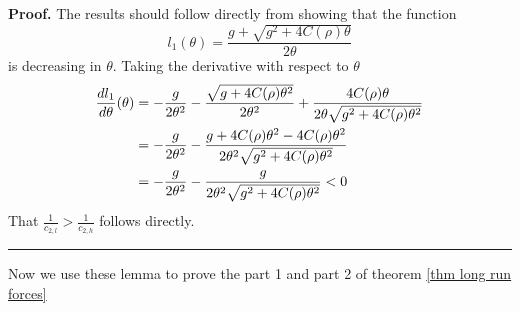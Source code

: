 \documentclass[thmsb,11pt]{article}
\newenvironment{proof}[1][Proof]{\noindent \textbf{#1.} }{\  \rule{0.5em}{0.5em}}
\begin{document}
\begin{proof}
The results should follow directly from showing that
the function
\begin{equation*}
l_1(\theta) = \frac{g+\sqrt{g^2+4C(\rho)\theta}}{2\theta}
\end{equation*}%
is decreasing in $\theta$. Taking the derivative with respect to $\theta$
\begin{align*}
\frac{d l_1}{d\theta}(\theta) &=- \frac g{2\theta^2}-\frac{\sqrt{%
g+4C(\rho)\theta^2}}{2\theta^2} +\frac{4C(\rho)\theta}{2\theta\sqrt{%
g^2+4C(\rho)\theta^2}} \\
&=-\frac g{2\theta^2}-\frac{g+4C(\rho)\theta^2-4C(\rho)\theta^2}{2\theta^2%
\sqrt{g^2+4C(\rho)\theta^2}} \\
&=-\frac g{2\theta^2}-\frac{g}{2\theta^2\sqrt{g^2+4C(\rho)\theta^2}}<0
\end{align*}
That $\frac1{c_{2,l}}>\frac1{c_{2,h}}$ follows directly.
\end{proof}

Now we use these lemma to prove the part 1 and part 2 of theorem \ref{thm long run forces}
\end{document}
